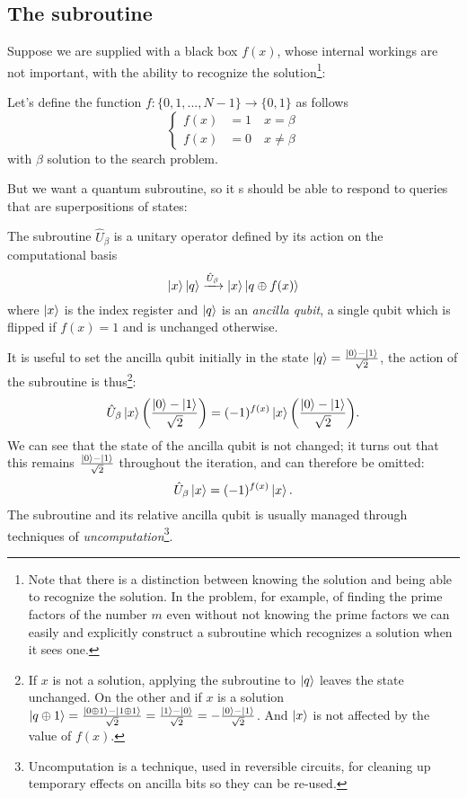 \subsection{The subroutine}\label{sec:subroutine}
Suppose we are supplied with a black box $f(x)$, whose internal workings are not important, with the ability to recognize the solution\footnote{Note that there is a distinction between knowing the solution and being able to recognize the solution. In the problem, for example, of finding the prime factors of the number $m$ even without not knowing the prime factors we can easily and explicitly construct a subroutine which recognizes a solution when it sees one.}:
\begin{defn}
Let's define the function $f: \{0,1,...,N-1\} \rightarrow \{0,1\}$ as follows
\begin{equation*}
    \begin{cases}
f(x) &= 1   \quad  x=\beta \\
f(x) &= 0   \quad x\neq\beta
\end{cases}
\end{equation*}
with $\beta$ solution to the search problem.
\end{defn}
But we want a quantum subroutine, so it s should be able to respond to queries that are superpositions of states:
\begin{defn}
The subroutine $\hat{U}_\beta$ is a unitary operator defined by its action on the computational basis
\begin{equation*}
    \ket{x}\ket{q} \xrightarrow{\hat{U}_\beta} \ket{x} \ket{q \oplus f(x)}
\end{equation*}
where $\ket{x}$ is the index register and $\ket{q}$ is an \emph{ancilla qubit}, a single qubit which is flipped if $f(x) = 1$ and is unchanged otherwise.
\end{defn}

It is useful to set the ancilla qubit initially in the state $\ket{q} = \frac{\ket{0}-\ket{1}}{\sqrt{2}}$, the action of the subroutine is thus\footnote{If $x$ is not a solution, applying the subroutine to $\ket{q}$ leaves the state unchanged. On the other and if $x$ is a solution $\ket{q \oplus 1} = \frac{\ket{0 \oplus 1} - \ket{1 \oplus 1}}{\sqrt{2}} = \frac{\ket{1}-\ket{0}}{\sqrt{2}} = - \frac{\ket{0}-\ket{1}}{\sqrt{2}}$. And $\ket{x}$ is not affected by the value of $f(x)$.}:
\begin{equation*}
    \hat{U}_\beta \ket{x} \biggl(\frac{\ket{0}-\ket{1}}{\sqrt{2}}\biggr) = (-1)^{f(x)} \ket{x} \biggl(\frac{\ket{0}-\ket{1}}{\sqrt{2}}\biggr).
\end{equation*}
We can see that the state of the ancilla qubit is not changed; it turns out that this remains  $\frac{\ket{0}-\ket{1}}{\sqrt{2}}$ throughout the iteration, and can therefore be omitted:
\begin{equation*}
    \hat{U}_\beta \ket{x} = (-1)^{f(x)} \ket{x}.
\end{equation*}
The subroutine and its relative ancilla qubit is usually managed through techniques of \emph{uncomputation}\footnote{Uncomputation is a technique, used in reversible circuits, for cleaning up temporary effects on ancilla bits so they can be re-used.}.

